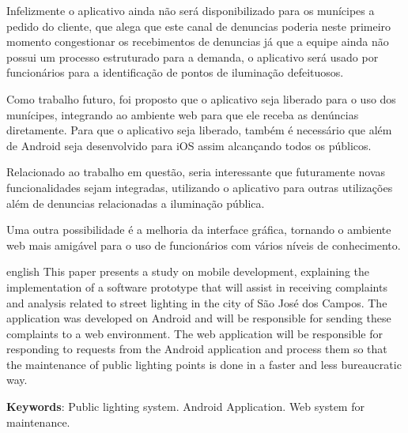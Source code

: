 \documentclass[
	article,			%
	11pt,				%
	oneside,			%
	a4paper,			%
	english,			%
	brazil,				%
	sumario=tradicional
	]{abntex2}
\begin{document}
Infelizmente o aplicativo ainda não será disponibilizado para os munícipes a
pedido do cliente, que alega que este canal de denuncias poderia  neste primeiro
momento congestionar os recebimentos de denuncias já que a equipe ainda não
possui um processo estruturado para a demanda, o aplicativo será usado por
funcionários para a identificação de pontos de iluminação defeituosos.

Como trabalho futuro, foi proposto que o aplicativo seja liberado para o uso
dos munícipes, integrando ao ambiente web para que ele receba as denúncias
diretamente. Para que o aplicativo seja liberado, também é necessário que
além de Android seja desenvolvido para iOS assim alcançando todos os públicos.

Relacionado ao trabalho em questão, seria interessante que futuramente novas
funcionalidades sejam integradas, utilizando o aplicativo para outras
utilizações além de denuncias relacionadas a iluminação pública.

Uma outra possibilidade é a melhoria da interface gráfica, tornando o ambiente
web mais amigável para o uso de funcionários com vários níveis de conhecimento.

\postextual



\emptythanks
\maketitle
\renewcommand{\resumoname}{Abstract}
\begin{resumoumacoluna}
 \begin{otherlanguage*}{english}
   This paper presents a study on mobile development, explaining the
   implementation of a software prototype that will assist in receiving
   complaints and analysis related to street lighting in the city of São José
   dos Campos. The application was developed on Android and will be responsible
   for sending these complaints to a web environment. The web application
   will be responsible for responding to requests from the Android application
   and process them so that the maintenance of public lighting points is done
   in a faster and less bureaucratic way.
   \vspace{\onelineskip}

   \noindent
   \textbf{Keywords}: Public lighting system. Android Application. Web system for maintenance.
 \end{otherlanguage*}
\end{resumoumacoluna}



\end{document}
